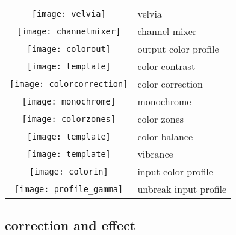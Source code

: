 \documentclass[\ArgLang,\ArgFormat,9pt]{extarticle}
\begin{document}
\begin{multicols}{3}
  \colorbox{keycol}{%
    \begin{tabularx}{\tabwidth}{cl} 
      \texttt{[image: velvia]} & velvia \\
      \texttt{[image: channelmixer]} & channel mixer \\
      \texttt{[image: colorout]} & output color profile \\
      \texttt{[image: template]} & color contrast \\
      \texttt{[image: colorcorrection]} & color correction \\
      \texttt{[image: monochrome]} & monochrome \\
      \texttt{[image: colorzones]} & color zones \\
      \texttt{[image: template]} & color balance \\
      \texttt{[image: template]} & vibrance \\
      \texttt{[image: colorin]} & input color profile \\
      \texttt{[image: profile\_gamma]} & unbreak input profile \\
    \end{tabularx}}

  \subsection{correction and effect}


\end{multicols}
\end{document}
